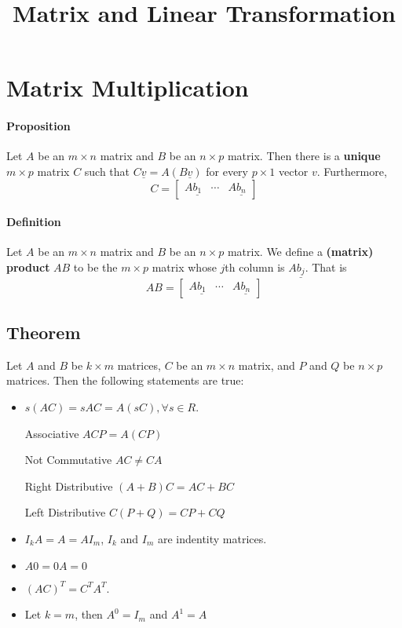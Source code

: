 \documentclass[12pt]{article}
\begin{document}
\title{Matrix and Linear Transformation}
\maketitle
\section{Matrix Multiplication}
\paragraph{Proposition}
Let $A$ be an $m\times n$ matrix and $B$ be an $n\times p$ matrix. Then there is a \textbf{unique} $m\times p$ matrix $C$ such that $C\underline{v}=A(B\underline{v})$ for every $p\times 1$ vector $v$. Furthermore,
$$
C = \left[
\begin{array}{ccc}
A\underline{b_1} & \cdots & A\underline{b_n}
\end{array}
\right]
$$
\paragraph{Definition}
Let $A$ be an $m\times n$ matrix and $B$ be an $n\times p$ matrix. We define a \textbf{(matrix) product} $AB$ to be the $m \times p$ matrix whose $j$th column is $A\underline{b_j}$. That is
$$
AB = \left[
\begin{array}{ccc}
A\underline{b_1} & \cdots & A\underline{b_n}
\end{array}
\right]
$$
\subsection{Theorem}
Let $A$ and $B$ be $k\times m$ matrices, $C$ be an $m\times n$ matrix, and $P$ and $Q$ be $n\times p$ matrices. Then the following statements are true:
\begin{itemize}
\item $s(AC)=sAC=A(sC), \forall s \in R$.
\item[Associative] $ACP=A(CP)$
\item[Not Commutative] $AC\neq CA$
\item[Right Distributive] $(A+B)C=AC+BC$
\item[Left Distributive] $C(P+Q)=CP+CQ$
\item $I_kA = A = AI_m$, $I_k$ and $I_m$ are indentity matrices.
\item $A0=0A=0$
\item $(AC)^T=C^TA^T$.
\item Let $k=m$, then $A^0=I_m$ and $A^1=A$
\end{itemize}
\end{document}
